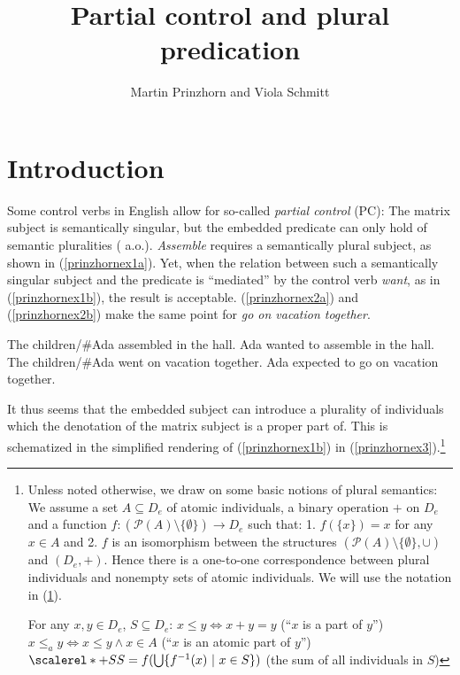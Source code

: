 \documentclass[output=paper,colorlinks,citecolor=brown,
]{langscibook}
\author{Martin Prinzhorn\affiliation{University of Vienna} and Viola Schmitt\orcid{}\affiliation{Humboldt-Universität zu Berlin}}
\title{Partial control and plural predication}
\begin{document}
\maketitle

\section{Introduction}\label{prinzhornsec:1}

Some control verbs in English allow for so-called  {\it partial control} (PC): The matrix subject is semantically singular, but the embedded predicate can only hold of semantic pluralities (\cite{Wilkinson:1971, Landau:2000, Wurmbrand:2001, Wurmbrand:2002, Pearson:2016} a.o.). {\it Assemble} requires a semantically plural subject, as shown in (\ref{prinzhornex1a}). Yet, when the relation between such a semantically singular subject and the predicate is “mediated” by the control verb {\it want}, as in (\ref{prinzhornex1b}), the result is acceptable. (\ref{prinzhornex2a}) and (\ref{prinzhornex2b}) make the same point for {\it go on vacation together}.

\ea  
\ea The children\slash\#Ada assembled in the hall. \label{prinzhornex1a}
\ex	Ada wanted to assemble in the hall. \hfill \citep[(1a)]{Pearson:2016} \label{prinzhornex1b}
\ex The children\slash\#Ada went on vacation together. \label{prinzhornex2a}
\ex Ada expected to go on vacation together. \hfill \citep[(1b)]{Pearson:2016} \label{prinzhornex2b}
\z\z
	
It thus seems that the embedded subject can introduce a plurality of individuals which the denotation of the matrix subject is a proper part of. This is schematized in the simplified rendering of (\ref{prinzhornex1b}) in (\ref{prinzhornex3}).\footnote{Unless noted otherwise, we draw on some basic notions of plural semantics: We assume a set $A \subseteq D_e$ of atomic individuals, a binary operation $+$ on $D_e$ and a function $f\colon (\mathcal{P}(A)\setminus \{\emptyset\}) \to D_e$ such that: 1. $f(\{x\}) = x$ for any $x \in A$ and 2. $f$ is an isomorphism between the structures $(\mathcal{P}(A)\setminus \{\emptyset\}, \cup)$ and $(D_e, +)$. Hence there is a one-to-one correspondence between plural individuals and nonempty sets of atomic individuals. We will use the notation in (\ref{prinzhornDD}).

\ea \label{prinzhornDD} For any $x, y \in D_e$, $S \subseteq D_e$:
\ea $x \leq y \Leftrightarrow x + y = y$ (``$x$ is a part of $y$'')
 \ex $x \leq_{a} y \Leftrightarrow x \leq y \land x \in A$ (``$x$ is an atomic part of $y$'')
\ex  $\scalerel*{+}{S}S = f(\bigcup\{f^{-1}(x)\ |\ x \in S\})$ (the sum of all individuals in $S$)
\z\z}
\end{document}
